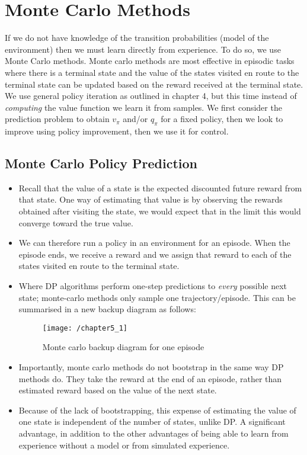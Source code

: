 \section{Monte Carlo Methods}
If we do not have knowledge of the transition probabilities (model of the environment) then we must learn directly from experience. To do so, we use Monte Carlo methods. Monte carlo methods are most effective in episodic tasks where there is a terminal state and the value of the states visited en route to the terminal state can be updated based on the reward received at the terminal state. We use general policy iteration as outlined in chapter 4, but this time instead of \textit{computing} the value function we learn it from samples. We first consider the prediction problem to obtain $v_\pi$ and/or \textbf{$q_\pi$} for a fixed policy, then we look to improve using policy improvement, then we use it for control.  

\subsection{Monte Carlo Policy Prediction}
\begin{itemize}
\item Recall that the value of a state is the expected discounted future reward from that state. One way of estimating that value is by observing the rewards obtained after visiting the state, we would expect that in the limit this would converge toward the true value.
\item We can therefore run a policy in an environment for an episode. When the episode ends, we receive a reward and we assign that reward to each of the states visited en route to the terminal state. 
\item Where DP algorithms perform one-step predictions to \textit{every} possible next state; monte-carlo methods only sample one trajectory/episode. This can be summarised in a new backup diagram as follows:
\begin{figure}[h!]
	\centering
	\texttt{[image: /chapter5\_1]}
	\caption{Monte carlo backup diagram for one episode}
	\label{fig:monte carlo backup}
\end{figure}

\item Importantly, monte carlo methods do not bootstrap in the same way DP methods do. They take the reward at the end of an episode, rather than estimated reward based on the value of the next state.
\item Because of the lack of bootstrapping, this expense of estimating the value of one state is independent of the number of states, unlike DP. A significant advantage, in addition to the other advantages of being able to learn from experience without a model or from simulated experience. 
\end{itemize}

